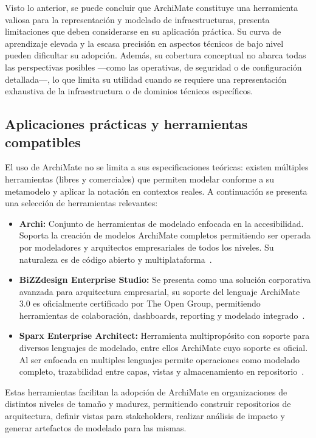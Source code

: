 Visto lo anterior, se puede concluir que ArchiMate constituye una herramienta valiosa para la representación y modelado de infraestructuras, presenta limitaciones que deben considerarse en su aplicación práctica. Su curva de aprendizaje elevada y la escasa precisión en aspectos técnicos de bajo nivel pueden dificultar su adopción. Además, su cobertura conceptual no abarca todas las perspectivas posibles ---como las operativas, de seguridad o de configuración detallada---, lo que limita su utilidad cuando se requiere una representación exhaustiva de la infraestructura o de dominios técnicos específicos.

\subsection{Aplicaciones prácticas y herramientas compatibles}

El uso de ArchiMate no se limita a sus especificaciones teóricas: existen múltiples herramientas (libres y comerciales) que permiten modelar conforme a su metamodelo y aplicar la notación en contextos reales. A continuación se presenta una selección de herramientas relevantes:

\begin{itemize}
	\item \textbf{Archi:} Conjunto de herramientas de modelado enfocada en la accesibilidad. Soporta la creación de modelos ArchiMate completos permitiendo ser operada por modeladores y arquitectos empresariales de todos los niveles. Su naturaleza es de código abierto y multiplataforma~\cite{Archi01}.
	\item \textbf{BiZZdesign Enterprise Studio:} Se presenta como una solución corporativa avanzada para arquitectura empresarial, su soporte del lenguaje ArchiMate 3.0 es oficialmente certificado por The Open Group, permitiendo herramientas de colaboración, dashboards, reporting y modelado integrado~\cite{Bizz01}.
	\item \textbf{Sparx Enterprise Architect:} Herramienta multipropósito con soporte para diversos lenguajes de modelado, entre ellos ArchiMate cuyo soporte es oficial. Al ser enfocada en multiples lenguajes permite operaciones como modelado completo, trazabilidad entre capas, vistas y almacenamiento en repositorio~\cite{EA_GUIDE01}.
\end{itemize}

Estas herramientas facilitan la adopción de ArchiMate en organizaciones de distintos niveles de tamaño y madurez, permitiendo construir repositorios de arquitectura, definir vistas para stakeholders, realizar análisis de impacto y generar artefactos de modelado para las mismas.

